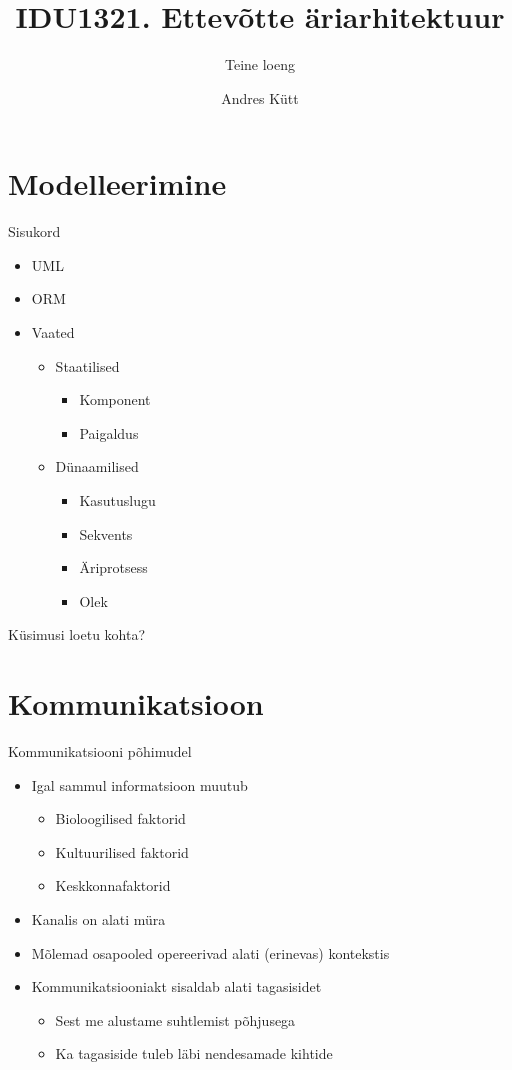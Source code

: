 \documentclass{beamer}
\title{IDU1321. Ettevõtte äriarhitektuur}
\subtitle{Teine loeng}
\author{Andres Kütt}
\institute{Cybernetica, arhitekt}
\begin{document}
\begin{frame}
\titlepage
\end{frame}

\section{Modelleerimine}
\begin{frame}{Sisukord}
	\begin{itemize}
		\item UML
		\item ORM
		\item Vaated
		\begin{itemize}
			\item Staatilised
			\begin{itemize}
				\item Komponent
				\item Paigaldus
			\end{itemize}
			\item Dünaamilised
			\begin{itemize}
				\item Kasutuslugu
				\item Sekvents
				\item Äriprotsess
				\item Olek
			\end{itemize}
		\end{itemize}
	\end{itemize}
\end{frame}

\begin{frame}[standout]
Küsimusi loetu kohta?
\end{frame}

\section{Kommunikatsioon}
\begin{frame}{Kommunikatsiooni põhimudel}
	\begin{itemize}
		\item Igal sammul informatsioon muutub
		\begin{itemize}
			\item Bioloogilised faktorid
			\item Kultuurilised faktorid
			\item Keskkonnafaktorid
		\end{itemize}
		\item Kanalis on alati müra
		\item Mõlemad osapooled opereerivad alati (erinevas) kontekstis
		\item Kommunikatsiooniakt sisaldab alati tagasisidet
		\begin{itemize}
			\item Sest me alustame suhtlemist põhjusega
			\item Ka tagasiside tuleb läbi nendesamade kihtide
		\end{itemize}
	\end{itemize}
\end{frame}
\end{document}
